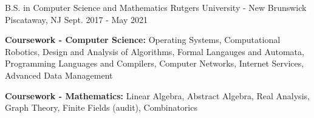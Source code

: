 


\begin{cventries}


  \cventry
  {B.S. in Computer Science and Mathematics} %
  {Rutgers University - New Brunswick} %
  {Piscataway, NJ} %
  {Sept. 2017 - May 2021} %
  { %
    \begin{cvitems}
    \item {\textbf{Coursework - Computer Science:} Operating Systems, Computational Robotics, Design and Analysis of Algorithms, Formal Langauges and Automata, Programming Languages and Compilers, Computer Networks, Internet Services, Advanced Data Management}
    \item {\textbf{Coursework - Mathematics:} Linear Algebra, Abstract Algebra, Real Analysis, Graph Theory, Finite Fields (audit), Combinatorics}
    \end{cvitems}
  }


\end{cventries}
